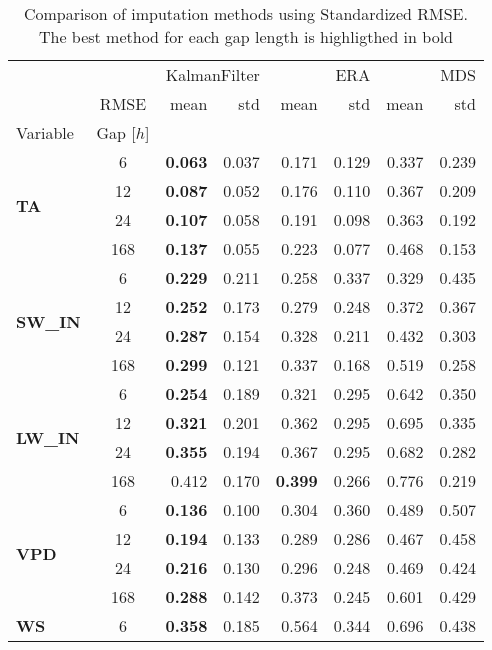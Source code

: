 \begin{table}
\centering
\caption{Comparison of imputation methods using Standardized RMSE. The best method for each gap length is highligthed in bold}
\label{the_table_stand}
\begin{tabular}{p{2.1cm}c|rr|rr|rr}
\toprule
 &  & \multicolumn{2}{r}{KalmanFilter} & \multicolumn{2}{r}{ERA} & \multicolumn{2}{r}{MDS} \\
 & RMSE & mean & std & mean & std & mean & std \\
Variable & Gap [$h$] &  &  &  &  &  &  \\
\midrule
\multirow[c]{4}{*}{\parbox{2.1cm}{\textbf{TA}}} & 6 & \bfseries 0.063 & 0.037 & 0.171 & 0.129 & 0.337 & 0.239 \\
 & 12 & \bfseries 0.087 & 0.052 & 0.176 & 0.110 & 0.367 & 0.209 \\
 & 24 & \bfseries 0.107 & 0.058 & 0.191 & 0.098 & 0.363 & 0.192 \\
 & 168 & \bfseries 0.137 & 0.055 & 0.223 & 0.077 & 0.468 & 0.153 \\
\cline{1-8}
\multirow[c]{4}{*}{\parbox{2.1cm}{\textbf{SW\_IN}}} & 6 & \bfseries 0.229 & 0.211 & 0.258 & 0.337 & 0.329 & 0.435 \\
 & 12 & \bfseries 0.252 & 0.173 & 0.279 & 0.248 & 0.372 & 0.367 \\
 & 24 & \bfseries 0.287 & 0.154 & 0.328 & 0.211 & 0.432 & 0.303 \\
 & 168 & \bfseries 0.299 & 0.121 & 0.337 & 0.168 & 0.519 & 0.258 \\
\cline{1-8}
\multirow[c]{4}{*}{\parbox{2.1cm}{\textbf{LW\_IN}}} & 6 & \bfseries 0.254 & 0.189 & 0.321 & 0.295 & 0.642 & 0.350 \\
 & 12 & \bfseries 0.321 & 0.201 & 0.362 & 0.295 & 0.695 & 0.335 \\
 & 24 & \bfseries 0.355 & 0.194 & 0.367 & 0.295 & 0.682 & 0.282 \\
 & 168 & 0.412 & 0.170 & \bfseries 0.399 & 0.266 & 0.776 & 0.219 \\
\cline{1-8}
\multirow[c]{4}{*}{\parbox{2.1cm}{\textbf{VPD}}} & 6 & \bfseries 0.136 & 0.100 & 0.304 & 0.360 & 0.489 & 0.507 \\
 & 12 & \bfseries 0.194 & 0.133 & 0.289 & 0.286 & 0.467 & 0.458 \\
 & 24 & \bfseries 0.216 & 0.130 & 0.296 & 0.248 & 0.469 & 0.424 \\
 & 168 & \bfseries 0.288 & 0.142 & 0.373 & 0.245 & 0.601 & 0.429 \\
\cline{1-8}
\multirow[c]{4}{*}{\parbox{2.1cm}{\textbf{WS}}} & 6 & \bfseries 0.358 & 0.185 & 0.564 & 0.344 & 0.696 & 0.438 \\

\end{tabular}
\end{table}
